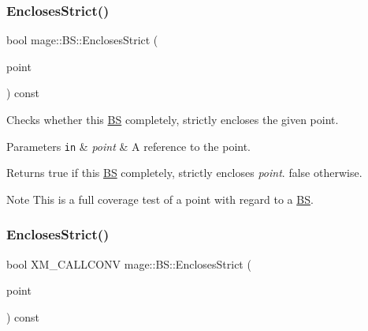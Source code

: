 \subsubsection{\texorpdfstring{Encloses\+Strict()}{EnclosesStrict()}\hspace{0.1cm}{\footnotesize\ttfamily [1/4]}}
{\footnotesize\ttfamily bool mage\+::\+B\+S\+::\+Encloses\+Strict (\begin{DoxyParamCaption}\item[{const \hyperlink{structmage_1_1_point3}{Point3} \&}]{point }\end{DoxyParamCaption}) const\hspace{0.3cm}{\ttfamily [noexcept]}}

Checks whether this \hyperlink{classmage_1_1_b_s}{BS} completely, strictly encloses the given point.


\begin{DoxyParams}[1]{Parameters}
\mbox{\tt in}  & {\em point} & A reference to the point. \\
\hline
\end{DoxyParams}
\begin{DoxyReturn}{Returns}
{\ttfamily true} if this \hyperlink{classmage_1_1_b_s}{BS} completely, strictly encloses {\itshape point}. {\ttfamily false} otherwise. 
\end{DoxyReturn}
\begin{DoxyNote}{Note}
This is a full coverage test of a point with regard to a \hyperlink{classmage_1_1_b_s}{BS}. 
\end{DoxyNote}
\hypertarget{classmage_1_1_b_s_adc21b04ca192c599c16e0fb49e598342}{}\label{classmage_1_1_b_s_adc21b04ca192c599c16e0fb49e598342} 
\subsubsection{\texorpdfstring{Encloses\+Strict()}{EnclosesStrict()}\hspace{0.1cm}{\footnotesize\ttfamily [2/4]}}
{\footnotesize\ttfamily bool X\+M\+\_\+\+C\+A\+L\+L\+C\+O\+NV mage\+::\+B\+S\+::\+Encloses\+Strict (\begin{DoxyParamCaption}\item[{F\+X\+M\+V\+E\+C\+T\+OR}]{point }\end{DoxyParamCaption}) const\hspace{0.3cm}{\ttfamily [noexcept]}}


